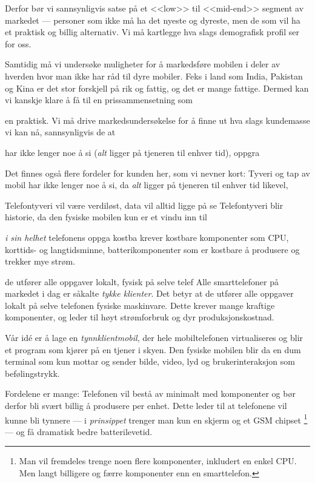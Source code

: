 Derfor bør vi sannsynligvis satse på et <<low>> til <<mid-end>> segment av
markedet --- personer som ikke må ha det nyeste og dyreste, men de som vil ha
et praktisk og billig alternativ.  Vi må kartlegge hva slags demografisk profil
ser for oss.

Samtidig må vi undersøke muligheter for å markedsføre mobilen i deler av
hverden hvor man ikke har råd til dyre mobiler. Feks i land som India, Pakistan
og Kina er det stor forskjell på rik og fattig, og det er mange fattige. Dermed
kan vi kanskje klare å få til en prissammensetning som 


en praktisk. Vi må drive markedsundersøkelse for å finne ut hva slags kundemasse
vi kan nå, sannsynligvis de 
at

har ikke lenger noe å si (\textit{alt} ligger på tjeneren til enhver tid),
oppgra

Det finnes også flere fordeler for kunden her, som vi nevner kort: Tyveri og
tap av mobil har ikke lenger noe å si, da \textit{alt} ligger på tjeneren til
enhver tid likevel,

Telefontyveri vil være verdiløst, data vil alltid ligge på se
Telefontyveri blir historie, da den fysiske mobilen kun er et vindu inn til 

\textit{i sin helhet}
telefonens oppga
kostba
krever kostbare komponenter som CPU, korttids- og langtidsminne, batterikomponenter som er kostbare å produsere og trekker mye strøm.

de utfører alle oppgaver lokalt, fysisk på selve telef
Alle smarttelefoner på markedet i dag er såkalte \textit{tykke klienter}. Det
betyr at de utfører alle oppgaver lokalt på selve telefonen fysiske maskinvare.
Dette krever mange kraftige komponenter, og leder til høyt strømforbruk og dyr
produksjonskostnad.

Vår idé er å lage en \textit{tynnklientmobil}, der hele mobiltelefonen
virtualiseres og blir et program som kjører på en tjener i skyen. Den fysiske
mobilen blir da en dum terminal som kun mottar og sender bilde, video, lyd og
brukerinteraksjon som befølingstrykk.

Fordelene er mange: Telefonen vil bestå av minimalt med komponenter og bør
derfor bli svært billig å produsere per enhet. Dette leder til at telefonene
vil kunne bli tynnere --- i \textit{prinsippet} trenger man kun en skjerm og et
GSM chipset \footnote{Man vil fremdeles trenge noen flere komponenter,
  inkludert en enkel CPU. Men langt billigere og færre komponenter enn en
smarttelefon.} --- og få dramatisk bedre batterilevetid.

